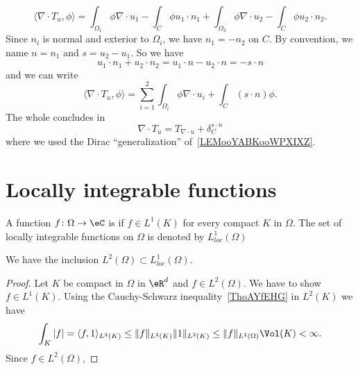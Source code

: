 \begin{equation}
    \langle \nabla\cdot T_u, \phi\rangle =\int_{\Omega_1}\phi\nabla\cdot u_1-\int_C\phi u_1\cdot n_1+\int_{\Omega_2}\phi\nabla\cdot u_2-\int_C\phi u_2\cdot n_2.
\end{equation}
Since \( n_i\) is normal and exterior to \( \Omega_i\), we have \( n_1=-n_2\) on \( C\). By convention, we name \( n=n_1\) and \( s=u_2-u_1\). So we have
\begin{equation}
    u_1\cdot n_1+u_2\cdot n_2=u_1\cdot n-u_2\cdot n=-s\cdot n
\end{equation}
and we can write
\begin{equation}
    \langle \nabla\cdot T_u, \phi\rangle =\sum_{i=1}^2\int_{\Omega_i}\phi\nabla\cdot u_i+\int_C(s\cdot n)\phi.
\end{equation}
The whole concludes in
\begin{equation}
    \nabla\cdot T_u=T_{\nabla\cdot u}+\delta_C^{s\cdot n}
\end{equation}
where we used the Dirac ``generalization'' of~\ref{LEMooYABKooWPXIXZ}.

\section{Locally integrable functions}

\begin{definition}
    A function \( f\colon \Omega\to \eC\) is  if \( f\in L^1(K)\) for every compact \( K\) in \( \Omega\). The set of locally integrable functions on \( \Omega\) is denoted by \( L^1_{loc}(\Omega)\)
\end{definition}

\begin{proposition}
    We have the inclusion \( L^2(\Omega)\subset L^1_{loc}(\Omega)\).
\end{proposition}

\begin{proof}
    Let \( K\) be compact in \( \Omega\) in \( \eR^d\) and \( f\in L^2(\Omega)\). We have to show \( f\in L^1(K)\). Using the Cauchy-Schwarz inequality~\ref{ThoAYfEHG} in \( L^2(K)\) we have
    \begin{equation}
        \int_K| f |=\langle f, 1\rangle_{L^2(K)} \leq \| f \|_{L^2(K)}\| 1 \|_{L^2(K)}\leq \| f \|_{L^2(\Omega)}\Vol(K)<\infty.
    \end{equation}
    Since \( f\in L^2(\Omega)\),
\end{proof}

